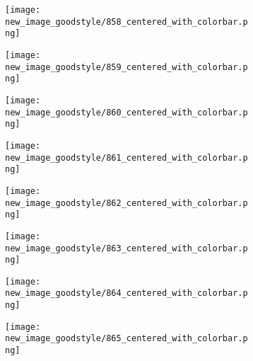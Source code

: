 \documentclass[a4paper,12pt]{article}
\begin{document}
\begin{figure}[H]
  \begin{subfigure}{0.11\textwidth}
    \texttt{[image: new\_image\_goodstyle/858\_centered\_with\_colorbar.png]}
  \end{subfigure}
  \hfill
  \begin{subfigure}{0.11\textwidth}
    \texttt{[image: new\_image\_goodstyle/859\_centered\_with\_colorbar.png]}
  \end{subfigure}
  \hfill
  \begin{subfigure}{0.11\textwidth}
    \texttt{[image: new\_image\_goodstyle/860\_centered\_with\_colorbar.png]}
  \end{subfigure}
  \hfill
  \begin{subfigure}{0.11\textwidth}
    \texttt{[image: new\_image\_goodstyle/861\_centered\_with\_colorbar.png]}
  \end{subfigure}
  \hfill
  \begin{subfigure}{0.11\textwidth}
    \texttt{[image: new\_image\_goodstyle/862\_centered\_with\_colorbar.png]}
  \end{subfigure}
  \hfill
  \begin{subfigure}{0.11\textwidth}
    \texttt{[image: new\_image\_goodstyle/863\_centered\_with\_colorbar.png]}
  \end{subfigure}
  \hfill
  \begin{subfigure}{0.11\textwidth}
    \texttt{[image: new\_image\_goodstyle/864\_centered\_with\_colorbar.png]}
  \end{subfigure}
  \hfill
  \begin{subfigure}{0.11\textwidth}
    \texttt{[image: new\_image\_goodstyle/865\_centered\_with\_colorbar.png]}
  \end{subfigure}
  \hfill
\end{figure}
\end{document}
